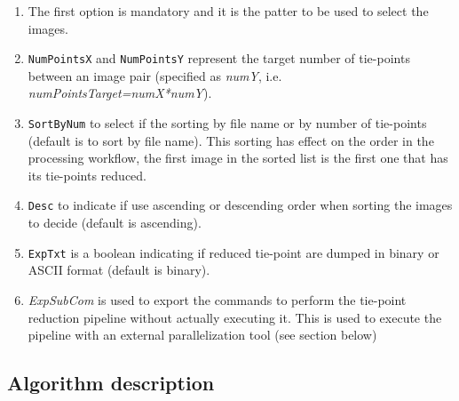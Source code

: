 \begin{enumerate}
\item The first option is mandatory and it is the patter to be used to select the images.

\item {\tt NumPointsX} and {\tt NumPointsY} represent the target number of tie-points between an image pair (specified as \textit{numY}, i.e. \textit{numPointsTarget=numX*numY}).
   
\item {\tt SortByNum} to select if the sorting by file name or by number of tie-points (default is to sort by file name). This sorting has effect on the order in the processing workflow, the first image in the sorted list is the first one that has its tie-points reduced.

\item {\tt Desc} to indicate if use ascending or descending order when sorting the images to decide (default is ascending).

\item {\tt ExpTxt} is a boolean indicating if reduced tie-point are dumped in binary or ASCII format (default is binary).

\item \textit{ExpSubCom} is used to export the commands to perform the tie-point reduction pipeline without actually executing it. This is used to execute the pipeline with an external parallelization tool (see section below)
\end{enumerate}


\subsection{Algorithm description}

